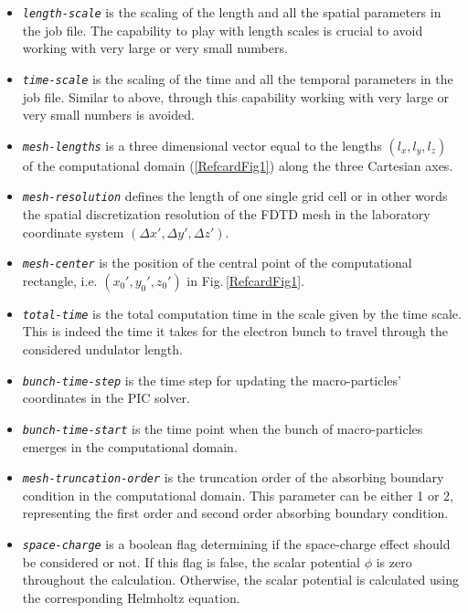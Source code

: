 \begin{itemize}
	\item {\tt \em \small length-scale} is the scaling of the length and all the spatial parameters in the job file. The capability to play with length scales is crucial to avoid working with very large or very small numbers.
	\item {\tt \em \small time-scale} is the scaling of the time and all the temporal parameters in the job file. Similar to above, through this capability working with very large or very small numbers is avoided.
	\item {\tt \em \small mesh-lengths} is a three dimensional vector equal to the lengths $(l_x,l_y,l_z)$ of the computational domain (\ref{RefcardFig1}) along the three Cartesian axes.
	\item {\tt \em \small mesh-resolution} defines the length of one single grid cell or in other words the spatial discretization resolution of the FDTD mesh in the laboratory coordinate system $(\Delta x',\Delta y',\Delta z')$.
	\item {\tt \em \small mesh-center} is the position of the central point of the computational rectangle, i.e. $(x_0',y_0',z_0')$ in Fig.\,\ref{RefcardFig1}.
	\item {\tt \em \small total-time} is the total computation time in the scale given by the time scale. This is indeed the time it takes for the electron bunch to travel through the considered undulator length.
	\item {\tt \em \small bunch-time-step} is the time step for updating the macro-particles' coordinates in the PIC solver.
	\item {\tt \em \small bunch-time-start} is the time point when the bunch of macro-particles emerges in the computational domain.
	\item {\tt \em \small mesh-truncation-order} is the truncation order of the absorbing boundary condition in the computational domain. This parameter can be either 1 or 2, representing the first order and second order absorbing boundary condition.
	\item {\tt \em \small space-charge} is a boolean flag determining if the space-charge effect should be considered or not. If this flag is false, the scalar potential $\phi$ is zero throughout the calculation. Otherwise, the scalar potential is calculated using the corresponding Helmholtz equation.
\end{itemize}

